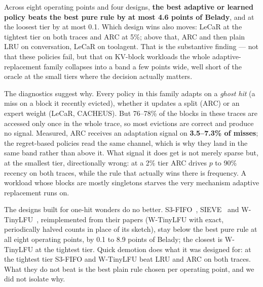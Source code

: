 \medskip
\noindent Across eight operating points and four designs, \textbf{the best adaptive or learned policy
beats the best pure rule by at most 4.6 points of Belady}, and at the loosest tier by at most 0.1. Which
design wins also moves: LeCaR at the tightest tier on both traces and ARC at 5\%; above that, ARC and
then plain LRU on conversation, LeCaR on toolagent. That is the substantive finding --- not that these policies fail, but that on KV-block workloads
the whole adaptive-replacement family collapses into a band a few points wide, well short of the oracle
at the small tiers where the decision actually matters.

The diagnostics suggest why. Every policy in this family adapts
on a \emph{ghost hit} (a miss on a block it recently evicted), whether it updates a split (ARC) or
an expert weight (LeCaR, CACHEUS). But 76--78\% of the blocks in these traces are accessed only once in the whole trace, so
most evictions are correct and produce no signal. Measured, ARC receives an adaptation signal on
\textbf{3.5--7.3\% of misses}; the regret-based policies read the same channel, which is why they land
in the same band rather than above it. What signal it does get is not merely sparse but, at
the smallest tier, directionally wrong: at a 2\% tier ARC drives $p$ to 90\% recency on both traces, while
the rule that actually wins there is frequency. A workload whose blocks are mostly singletons starves the
very mechanism adaptive replacement runs on.

The designs built for one-hit wonders do no better. S3-FIFO~\cite{yang2023s3fifo},
SIEVE~\cite{zhang2024sieve} and W-TinyLFU~\cite{einziger2017tinylfu}, reimplemented from their papers
(W-TinyLFU with exact, periodically halved counts in place of its sketch), stay below the best pure rule at
all eight operating points, by 0.1 to 8.9 points of Belady; the closest is W-TinyLFU at the tightest tier.
Quick demotion does what it was designed for: at the tightest tier S3-FIFO and W-TinyLFU beat LRU and ARC on
both traces. What they do not beat is the best plain rule chosen per operating point, and we did not
isolate why.

